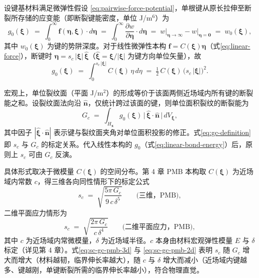 设键基材料满足微弹性假设 \eqref{eq:pairwise-force-potential}，单根键从原长拉伸至断裂所存储的应变能（即断裂键能密度，单位 J/m$^6$）为
\begin{equation}
  \label{eq:bond-fracture-energy}
  g_0(\boldsymbol{\xi}) \;=\; \int_0^{\infty} \mathbf{f}(\boldsymbol{\eta},\boldsymbol{\xi}) \cdot d\boldsymbol{\eta} \;=\; \int_0^{\infty} \frac{\partial w}{\partial\boldsymbol{\eta}} \cdot d\boldsymbol{\eta} \;=\; w\big|_{\boldsymbol{\eta}\to\infty} - w\big|_{\boldsymbol{\eta}=\mathbf{0}} \;=\; w_0(\boldsymbol{\xi}),
\end{equation}
其中 $w_0(\boldsymbol{\xi})$ 为键的势阱深度。对于线性微弹性本构 $\mathbf{f}=C(\boldsymbol{\xi})\boldsymbol{\eta}$（式\eqref{eq:linear-force}），断键时 $\boldsymbol{\eta}=s_c\,|\boldsymbol{\xi}|\,\hat{\boldsymbol{\xi}}$（$\hat{\boldsymbol{\xi}}=\boldsymbol{\xi}/|\boldsymbol{\xi}|$ 为键方向单位矢量），故
\begin{equation}
  \label{eq:linear-bond-energy}
  g_0(\boldsymbol{\xi}) \;=\; \int_0^{s_c\,|\boldsymbol{\xi}|} C(\boldsymbol{\xi})\,\eta\, d\eta \;=\; \tfrac{1}{2}\,C(\boldsymbol{\xi})\,\bigl(s_c\,|\boldsymbol{\xi}|\bigr)^2.
\end{equation}

宏观上，单位裂纹面（平面 J/m$^2$）的形成等价于该面两侧近场域内所有键的断裂能之和。设裂纹面法向沿 $\hat{\mathbf{n}}$，仅统计跨过该面的键，则单位面积裂纹的断裂能为
\begin{equation}
  \label{eq:gc-definition}
  G_c \;=\; \int_{H_{\mathbf{x}}} g_0(\boldsymbol{\xi})\, \bigl|\,\hat{\boldsymbol{\xi}}\cdot\hat{\mathbf{n}}\,\bigr|\, dV_{\boldsymbol{\xi}},
\end{equation}
其中因子 $|\hat{\boldsymbol{\xi}}\cdot\hat{\mathbf{n}}|$ 表示键与裂纹面夹角对单位面积投影的修正。式\eqref{eq:gc-definition} 即 $s_c$ 与 $G_c$ 的标定关系。代入线性本构的 $g_0$（式\eqref{eq:linear-bond-energy}）后，原则上 $s_c$ 可由 $G_c$ 反演。

具体形式取决于微模量 $C(\boldsymbol{\xi})$ 的空间分布。第 4 章 PMB 本构取 $C(\boldsymbol{\xi})$ 为近场域内常数 $c$，得三维各向同性情形下的标定公式
\begin{equation}
  \label{eq:sc-gc-pmb-3d}
  s_c \;=\; \sqrt{\frac{5\pi\,G_c}{9\,c\,\delta^5}} \qquad \text{(三维，PMB)},
\end{equation}
二维平面应力情形为
\begin{equation}
  \label{eq:sc-gc-pmb-2d}
  s_c \;=\; \sqrt{\frac{2\pi\,G_c}{c\,\delta^4}} \qquad \text{(二维平面应力，PMB)},
\end{equation}
其中 $c$ 为近场域内常微模量，$\delta$ 为近场域半径。$c$ 本身由材料宏观弹性模量 $E$ 与 $\delta$ 标定（详见第 4 章）。式\eqref{eq:sc-gc-pmb-3d} 与 \eqref{eq:sc-gc-pmb-2d} 表明 $s_c$ 随 $G_c$ 增大而增大（材料越韧，临界伸长率越大），随 $c$ 与 $\delta$ 增大而减小（近场域内键越多、键越刚，单键断裂所需的临界伸长率越小），符合物理直觉。

